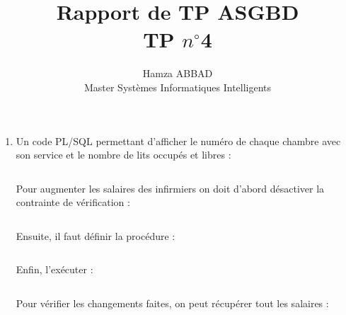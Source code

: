 \documentclass[12pt,a4paper]{article}
\author{Hamza ABBAD\\ Master Systèmes Informatiques Intelligents}
\title{\textbf{Rapport de TP ASGBD} \\ TP $n^{\circ}$4}
\begin{document}
\maketitle
\begin{enumerate}
    \item Un code PL/SQL permettant d'afficher le numéro de chaque chambre avec son
    service et le nombre de lits occupés et libres :
    \inputminted[firstline=4, lastline=18]{SQL}{../Scripts/TP4.sql}
    Pour augmenter les salaires des infirmiers on doit d'abord désactiver la contrainte de vérification :
    \inputminted[firstline=21, lastline=21]{SQL}{../Scripts/TP4.sql}
    Ensuite, il faut définir la procédure :
    \inputminted[firstline=22, lastline=29]{SQL}{../Scripts/TP4.sql}
    Enfin, l'exécuter :
    \inputminted[firstline=30, lastline=30]{SQL}{../Scripts/TP4.sql}
    Pour vérifier les changements faites, on peut récupérer tout les salaires :
    \inputminted[firstline=31, lastline=31]{SQL}{../Scripts/TP4.sql}
\end{enumerate}
\end{document}
